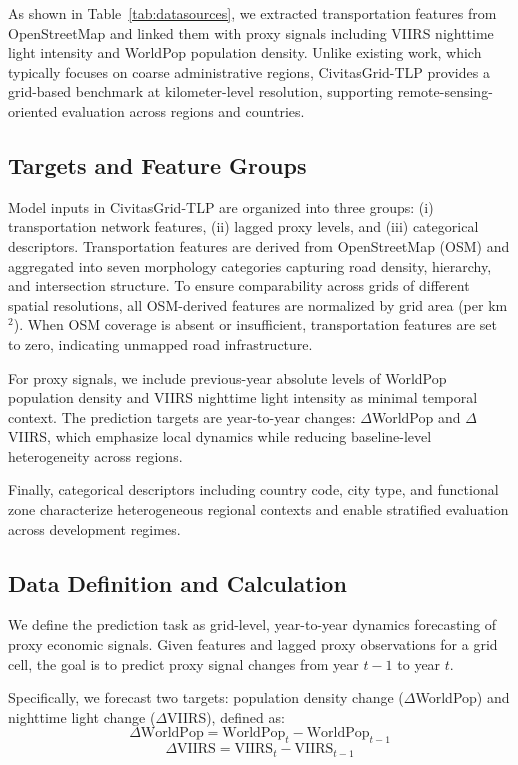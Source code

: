\documentclass[preprint,12pt]{elsarticle}
\begin{document}
As shown in Table~\ref{tab:datasources}, we extracted transportation features from OpenStreetMap and linked them with proxy signals including VIIRS nighttime light intensity and WorldPop population density. Unlike existing work, which typically focuses on coarse administrative regions, CivitasGrid-TLP provides a grid-based benchmark at kilometer-level resolution, supporting remote-sensing-oriented evaluation across regions and countries.


\subsection{Targets and Feature Groups}

Model inputs in CivitasGrid-TLP are organized into three groups: (i) transportation network features, (ii) lagged proxy levels, and (iii) categorical descriptors. Transportation features are derived from OpenStreetMap (OSM) and aggregated into seven morphology categories capturing road density, hierarchy, and intersection structure. To ensure comparability across grids of different spatial resolutions, all OSM-derived features are normalized by grid area (per km$^2$). When OSM coverage is absent or insufficient, transportation features are set to zero, indicating unmapped road infrastructure.

For proxy signals, we include previous-year absolute levels of WorldPop population density and VIIRS nighttime light intensity as minimal temporal context. The prediction targets are year-to-year changes: $\Delta$WorldPop and $\Delta$VIIRS, which emphasize local dynamics while reducing baseline-level heterogeneity across regions.

Finally, categorical descriptors including country code, city type, and functional zone characterize heterogeneous regional contexts and enable stratified evaluation across development regimes.



\subsection{Data Definition and Calculation}

We define the prediction task as grid-level, year-to-year dynamics forecasting of proxy economic signals. Given features and lagged proxy observations for a grid cell, the goal is to predict proxy signal changes from year $t-1$ to year $t$.

Specifically, we forecast two targets: population density change ($\Delta$WorldPop) and nighttime light change ($\Delta$VIIRS), defined as:
\begin{equation}
    \Delta \text{WorldPop} = \text{WorldPop}_t - \text{WorldPop}_{t-1}
\end{equation}
\begin{equation}
        \Delta \text{VIIRS} = \text{VIIRS}_t - \text{VIIRS}_{t-1}
\end{equation}
\end{document}
